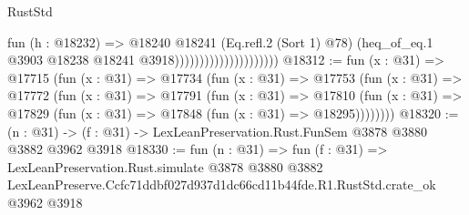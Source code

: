 \begin{lexlean}{RustStd}
\begin{coremodule}
                                          fun (h : @18232) =>
                                          @18240
                                            @18241
                                            (Eq.refl.{2} (Sort 1) @78)
                                            (heq_of_eq.{1}
                                              @3903
                                              @18238
                                              @18241
                                              @3918)))))))))))))))))))))
@18312 := fun (x : @31) =>
  @17715
    (fun (x : @31) =>
    @17734
      (fun (x : @31) =>
      @17753
        (fun (x : @31) =>
        @17772
          (fun (x : @31) =>
          @17791
            (fun (x : @31) =>
            @17810
              (fun (x : @31) => @17829 (fun (x : @31) => @17848 (fun (x : @31) => @18295))))))))
@18320 := (n : @31) -> (f : @31) -> LexLeanPreservation.Rust.FunSem @3878 @3880 @3882 @3962 @3918
@18330 := fun (n : @31) =>
  fun (f : @31) =>
  LexLeanPreservation.Rust.simulate
    @3878
    @3880
    @3882
    LexLeanPreserve.Ccfc71ddbf027d937d1dc66cd11b44fde.R1.RustStd.crate_ok
    @3962
    @3918
\end{coremodule}
\end{lexlean}

